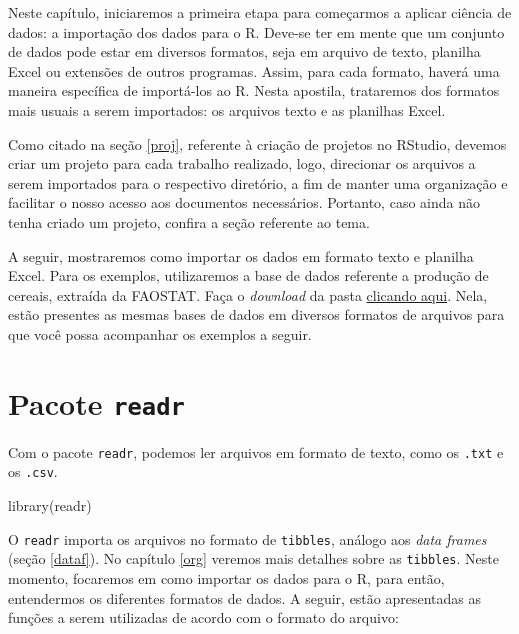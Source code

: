 \documentclass[
  brazilian,
]{book}
\newenvironment{Shaded}{\begin{snugshade}}{\end{snugshade}}
\newcommand{\FunctionTok}[1]{\textcolor[rgb]{0.00,0.00,0.00}{#1}}
\newcommand{\NormalTok}[1]{#1}
\begin{document}
Neste capítulo, iniciaremos a primeira etapa para começarmos a aplicar ciência de dados: a importação dos dados para o R. Deve-se ter em mente que um conjunto de dados pode estar em diversos formatos, seja em arquivo de texto, planilha Excel ou extensões de outros programas. Assim, para cada formato, haverá uma maneira específica de importá-los ao R. Nesta apostila, trataremos dos formatos mais usuais a serem importados: os arquivos texto e as planilhas Excel.

Como citado na seção \ref{proj}, referente à criação de projetos no RStudio, devemos criar um projeto para cada trabalho realizado, logo, direcionar os arquivos a serem importados para o respectivo diretório, a fim de manter uma organização e facilitar o nosso acesso aos documentos necessários. Portanto, caso ainda não tenha criado um projeto, confira a seção referente ao tema.

A seguir, mostraremos como importar os dados em formato texto e planilha Excel. Para os exemplos, utilizaremos a base de dados referente a produção de cereais, extraída da FAOSTAT. Faça o \emph{download} da pasta \href{https://github.com/gustavojy/ApostilaCD-R/blob/main/dados_zip/dados_importar.zip?raw=true}{clicando aqui}. Nela, estão presentes as mesmas bases de dados em diversos formatos de arquivos para que você possa acompanhar os exemplos a seguir.

\hypertarget{pacote-readr}{%
\section{\texorpdfstring{Pacote \texttt{readr}}{Pacote readr}}\label{pacote-readr}}

Com o pacote \texttt{readr}, podemos ler arquivos em formato de texto, como os \texttt{.txt} e os \texttt{.csv}.

\begin{Shaded}
\begin{Highlighting}[]
\FunctionTok{library}\NormalTok{(readr)}
\end{Highlighting}
\end{Shaded}

O \texttt{readr} importa os arquivos no formato de \texttt{tibbles}, análogo aos \emph{data frames} (seção \ref{dataf}). No capítulo \ref{org} veremos mais detalhes sobre as \texttt{tibbles}. Neste momento, focaremos em como importar os dados para o R, para então, entendermos os diferentes formatos de dados. A seguir, estão apresentadas as funções a serem utilizadas de acordo com o formato do arquivo:
\end{document}
